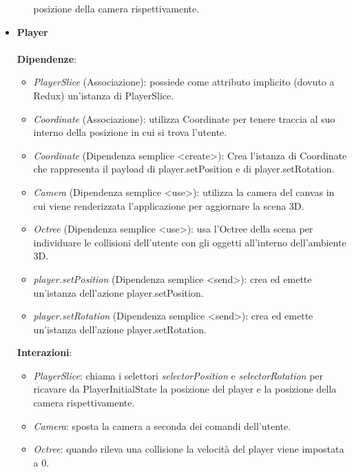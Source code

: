 \begin{itemize}
\begin{itemize}
			posizione della camera rispettivamente.
		\end{itemize}
		\item \textbf{Player}
		\\\\
		\textbf{Dipendenze}:
		\begin{itemize}
			\item \textit{PlayerSlice} (Associazione): possiede come attributo implicito (dovuto a Redux) un'istanza di PlayerSlice.
			\item \textit{Coordinate} (Associazione): utilizza Coordinate per tenere traccia al suo interno della posizione in cui si trova l'utente.
			\item \textit{Coordinate} (Dipendenza semplice \textless create\textgreater): Crea l'istanza di Coordinate che rappresenta il payload di player.setPosition
			e di player.setRotation.
			\item \textit{Camera} (Dipendenza semplice \textless use\textgreater): utilizza la camera del canvas in cui viene renderizzata l'applicazione
			 per aggiornare la scena 3D.
			\item \textit{Octree} (Dipendenza semplice \textless use\textgreater): usa l'Octree della scena per individuare le collisioni dell'utente con 
			gli oggetti all'interno dell'ambiente 3D.
			\item \textit{player.setPosition} (Dipendenza semplice \textless send\textgreater): crea ed emette un'istanza dell'azione player.setPosition.
			\item \textit{player.setRotation} (Dipendenza semplice \textless send\textgreater): crea ed emette un'istanza dell'azione player.setRotation.
		\end{itemize}
		\textbf{Interazioni}:
		\begin{itemize}
			\item \textit{PlayerSlice}: chiama i selettori \textit{selectorPosition} e \textit{selectorRotation} per ricavare da PlayerInitialState la
			posizione del player e la posizione della camera rispettivamente.
			\item \textit{Camera}: sposta la camera a seconda dei comandi dell'utente.
			\item \textit{Octree}: quando rileva una collisione la velocità del player viene impostata a 0. 
		\end{itemize}
\end{itemize}


